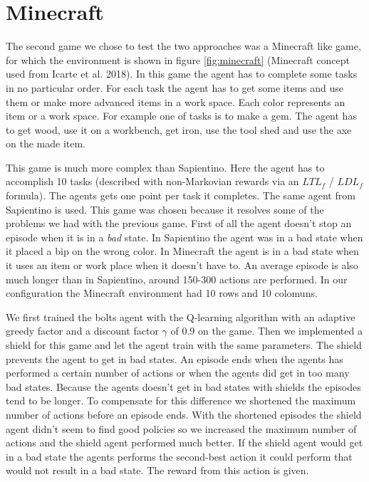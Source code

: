 \documentclass[letterpaper]{article}
\begin{document}
\section{Minecraft} %
The second game we chose to test the two approaches was a Minecraft like game, for which the environment is shown in figure \ref{fig:minecraft} (Minecraft concept used from Icarte et al. 2018). 
In this game the agent has to complete
some tasks in no particular order. For each task the agent has to get some items and use them
or make more advanced items in a work space. Each color represents an item or a work space. For example one of tasks is to make a gem. The agent has to get wood, use it on a workbench, get iron, use the tool shed and use the axe on the made item. 
\par This game is much more complex than Sapientino. Here the agent has to accomplish 10 tasks (described
with non-Markovian rewards via an $LTL_f$ / $LDL_f$ formula).
The agents gets one point per task it completes.
The same agent from Sapientino is used.
This game was chosen because it resolves some of the problems we had with the previous game. First of all the agent doesn't stop an episode when it is in a \textit{bad} state. In Sapientino the agent was in a bad state when it placed a bip on the wrong color. In Minecraft the agent is in a bad state when it uses an item or work place when it doesn't have to. An average episode is also much longer than in Sapientino, around 150-300 actions are performed. In our configuration the Minecraft environment had 10 rows and 10 colomuns. 
\par We first trained the bolts agent with the Q-learning algorithm with an adaptive greedy factor and a discount factor $\gamma$ of 0.9 on the game. Then we implemented a shield for this game and let the agent train with the same parameters. The shield prevents the agent to get in bad states. 
An episode ends when the agents has performed a certain number of actions or when the agents did get in too many bad states. Because the agents doesn't get in bad states with shields the episodes tend to be longer. To compensate for this difference we shortened the maximum number of actions before an episode ends. With the shortened episodes the shield agent didn't seem to find good policies so we increased the maximum number of actions and the shield agent performed much better. If the shield agent would get in a bad state
the agents performs the second-best action it could perform that would not result in a bad state. The reward from this action is given.
\end{document}
